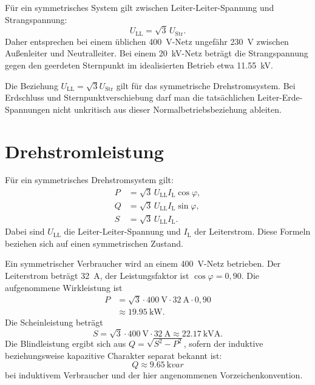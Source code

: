 Für ein symmetrisches System gilt zwischen Leiter-Leiter-Spannung und
Strangspannung:
\begin{equation}
  U_\mathrm{LL}=\sqrt{3}\,U_\mathrm{Str}.
  \label{eq:leiter_strang_spannung}
\end{equation}
Daher entsprechen bei einem üblichen \SI{400}{\volt}-Netz ungefähr
\SI{230}{\volt} zwischen Außenleiter und Neutralleiter. Bei einem
\SI{20}{\kilo\volt}-Netz beträgt die Strangspannung gegen den geerdeten
Sternpunkt im idealisierten Betrieb etwa \SI{11.55}{\kilo\volt}.

\begin{merke}
Die Beziehung \(U_\mathrm{LL}=\sqrt{3}U_\mathrm{Str}\) gilt für das
symmetrische Drehstromsystem. Bei Erdschluss und Sternpunktverschiebung darf
man die tatsächlichen Leiter-Erde-Spannungen nicht unkritisch aus dieser
Normalbetriebsbeziehung ableiten.
\end{merke}

\section{Drehstromleistung}

Für ein symmetrisches Drehstromsystem gilt:
\begin{align}
  P &= \sqrt{3}\,U_\mathrm{LL} I_\mathrm{L}\cos\varphi,\\
  Q &= \sqrt{3}\,U_\mathrm{LL} I_\mathrm{L}\sin\varphi,\\
  S &= \sqrt{3}\,U_\mathrm{LL} I_\mathrm{L}.
\end{align}
Dabei sind \(U_\mathrm{LL}\) die Leiter-Leiter-Spannung und \(I_\mathrm{L}\)
der Leiterstrom. Diese Formeln beziehen sich auf einen symmetrischen Zustand.

\begin{rechenbeispiel}
Ein symmetrischer Verbraucher wird an einem \SI{400}{\volt}-Netz betrieben.
Der Leiterstrom beträgt \SI{32}{\ampere}, der Leistungsfaktor ist
\(\cos\varphi=0{,}90\). Die aufgenommene Wirkleistung ist
\begin{align*}
  P &= \sqrt{3}\cdot \SI{400}{\volt}\cdot
       \SI{32}{\ampere}\cdot 0{,}90\\
    &\approx \SI{19.95}{\kilo\watt}.
\end{align*}
Die Scheinleistung beträgt
\[
S=\sqrt{3}\cdot\SI{400}{\volt}\cdot\SI{32}{\ampere}
 \approx \SI{22.17}{\kilo\volt\ampere}.
\]
Die Blindleistung ergibt sich aus \(Q=\sqrt{S^2-P^2}\), sofern der
induktive beziehungsweise kapazitive Charakter separat bekannt ist:
\[
Q\approx \SI{9.65}{\kilo var}
\]
bei induktivem Verbraucher und der hier angenommenen Vorzeichenkonvention.
\end{rechenbeispiel}

